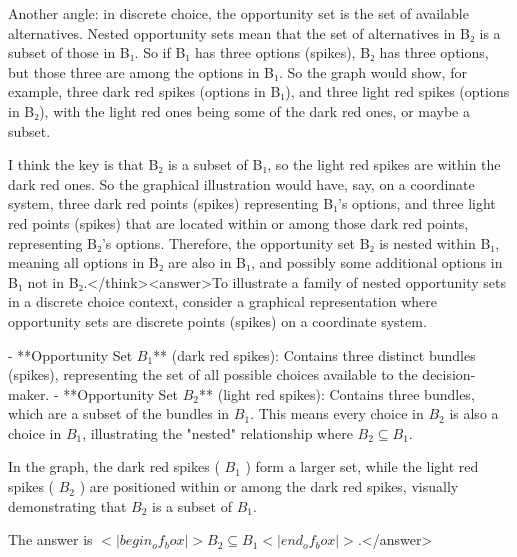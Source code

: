 Another angle: in discrete choice, the opportunity set is the set of available alternatives. Nested opportunity sets mean that the set of alternatives in B₂ is a subset of those in B₁. So if B₁ has three options (spikes), B₂ has three options, but those three are among the options in B₁. So the graph would show, for example, three dark red spikes (options in B₁), and three light red spikes (options in B₂), with the light red ones being some of the dark red ones, or maybe a subset. 

I think the key is that B₂ is a subset of B₁, so the light red spikes are within the dark red ones. So the graphical illustration would have, say, on a coordinate system, three dark red points (spikes) representing B₁'s options, and three light red points (spikes) that are located within or among those dark red points, representing B₂'s options. Therefore, the opportunity set B₂ is nested within B₁, meaning all options in B₂ are also in B₁, and possibly some additional options in B₁ not in B₂.</think><answer>To illustrate a family of nested opportunity sets in a discrete choice context, consider a graphical representation where opportunity sets are discrete points (spikes) on a coordinate system.  

- **Opportunity Set \( B_1 \)** (dark red spikes): Contains three distinct bundles (spikes), representing the set of all possible choices available to the decision-maker.  
- **Opportunity Set \( B_2 \)** (light red spikes): Contains three bundles, which are a subset of the bundles in \( B_1 \). This means every choice in \( B_2 \) is also a choice in \( B_1 \), illustrating the "nested" relationship where \( B_2 \subseteq B_1 \).  

In the graph, the dark red spikes ( \( B_1 \) ) form a larger set, while the light red spikes ( \( B_2 \) ) are positioned within or among the dark red spikes, visually demonstrating that \( B_2 \) is a subset of \( B_1 \).  

The answer is \(<|begin_of_box|>B_2 \subseteq B_1<|end_of_box|>\).</answer>
